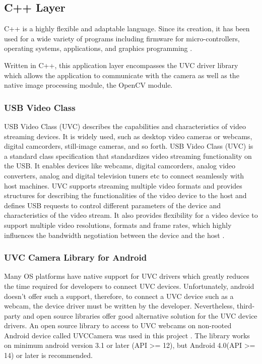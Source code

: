 \subsection{C++ Layer}


C++ is a highly flexible and adaptable language. Since its creation, it has been used for a wide variety of programs including firmware for micro-controllers, operating systems, applications, and graphics programming \parencite{cpp}.

Written in C++, this application layer encompasses the UVC driver library which allows the application to communicate with the camera as well as the native image processing module, the OpenCV module.

\subsubsection{USB Video Class}

USB Video Class (UVC) describes the capabilities and characteristics of video streaming devices. It is widely used, such as desktop video cameras or webcams, digital camcorders, still-image cameras, and so forth. USB Video Class (UVC) is a standard class specification that standardizes video streaming functionality on the USB. It enables devices like webcams, digital camcorders, analog video converters, analog and digital television tuners etc to connect seamlessly with host machines. UVC supports streaming multiple video formats and provides structures for describing the functionalities of the video device to the host and defines USB requests to control different parameters of the device and characteristics of the video stream. It also provides flexibility for a video device to support multiple video resolutions, formats and frame rates, which highly influences the bandwidth negotiation between the device and the host \parencite{uvc}.

\subsubsection{UVC Camera Library for Android}
Many OS platforms have native support for UVC drivers which greatly reduces the time required for developers to connect UVC devices. Unfortunately, android doesn’t offer such a support, therefore, to connect a UVC device such as a webcam, the device driver must be written by the developer. 
Nevertheless, third-party and open source libraries offer good alternative solution for the UVC device drivers. An open source library to access to UVC webcams on non-rooted Android device called UVCCamera was used in this project \parencite{uvcCamera}. The library works on minimum android version 3.1 or later (API >= 12), but Android 4.0(API >= 14) or later is recommended.


